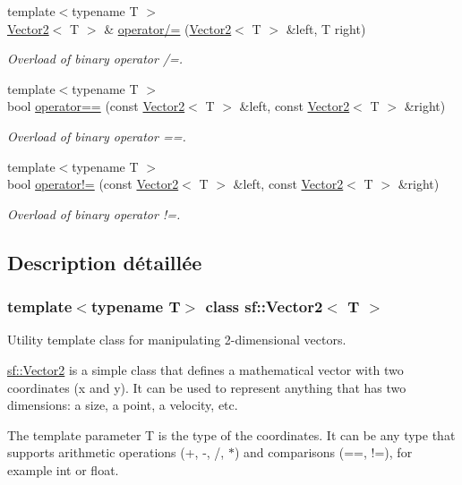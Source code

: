 \begin{DoxyCompactItemize}
{\footnotesize template$<$typename T $>$ }\\\hyperlink{classsf_1_1Vector2}{Vector2}$<$ T $>$ \& \hyperlink{classsf_1_1Vector2_ac4d293c9dc7954ccfd5e373972f38b03}{operator/=} (\hyperlink{classsf_1_1Vector2}{Vector2}$<$ T $>$ \&left, T right)
\begin{DoxyCompactList}\small\item\em Overload of binary operator /=. \end{DoxyCompactList}\item 
{\footnotesize template$<$typename T $>$ }\\bool \hyperlink{classsf_1_1Vector2_a9a7b2d36c3850828fdb651facfd25136}{operator==} (const \hyperlink{classsf_1_1Vector2}{Vector2}$<$ T $>$ \&left, const \hyperlink{classsf_1_1Vector2}{Vector2}$<$ T $>$ \&right)
\begin{DoxyCompactList}\small\item\em Overload of binary operator ==. \end{DoxyCompactList}\item 
{\footnotesize template$<$typename T $>$ }\\bool \hyperlink{classsf_1_1Vector2_a01673da35ef9c52d0e54b8263549a956}{operator!=} (const \hyperlink{classsf_1_1Vector2}{Vector2}$<$ T $>$ \&left, const \hyperlink{classsf_1_1Vector2}{Vector2}$<$ T $>$ \&right)
\begin{DoxyCompactList}\small\item\em Overload of binary operator !=. \end{DoxyCompactList}\end{DoxyCompactItemize}


\subsection{Description détaillée}
\subsubsection*{template$<$typename T$>$\newline
class sf\+::\+Vector2$<$ T $>$}

Utility template class for manipulating 2-\/dimensional vectors. 

\hyperlink{classsf_1_1Vector2}{sf\+::\+Vector2} is a simple class that defines a mathematical vector with two coordinates (x and y). It can be used to represent anything that has two dimensions\+: a size, a point, a velocity, etc.

The template parameter T is the type of the coordinates. It can be any type that supports arithmetic operations (+, -\/, /, $\ast$) and comparisons (==, !=), for example int or float.

